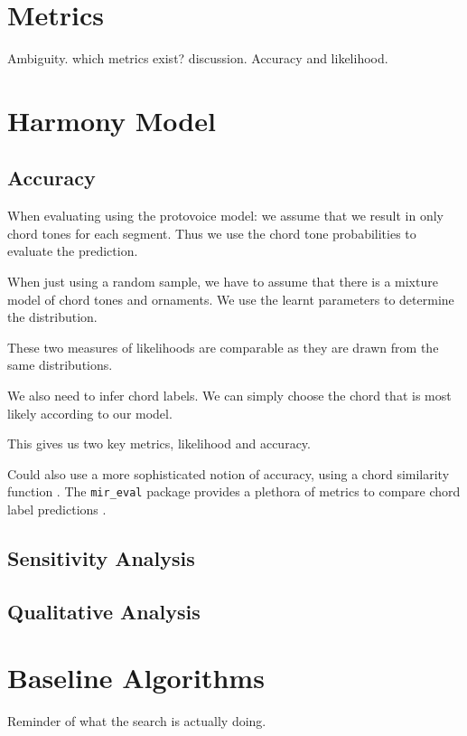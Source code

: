 \documentclass[12pt,a4paper,twoside,openright]{report}
\theoremstyle{definition}
\begin{document}
\section{Metrics}
Ambiguity. which metrics exist? discussion.
Accuracy and likelihood.

\section{Harmony Model}

\subsection{Accuracy}
When evaluating using the protovoice model: we assume that we result in only chord tones for each segment. Thus we use the chord tone probabilities to evaluate the prediction. 
\par
When just using a random sample, we have to assume that there is a mixture model of chord tones and ornaments. We use the learnt parameters to determine the distribution.
\par
These two measures of likelihoods are comparable as they are drawn from the same distributions.
\par
We also need to infer chord labels. We can simply choose the chord that is most likely according to our model.
\par 
This gives us two key metrics, likelihood and accuracy.
\par
Could also use a more sophisticated notion of accuracy, using a chord similarity function \cite{humphreyFourTimelyInsights2015}. The {\texttt {mir\_eval}} package provides a plethora of metrics to compare chord label predictions \cite{raffelMirEvalTransparent2014}. 

\subsection{Sensitivity Analysis}

\subsection{Qualitative Analysis}

\section{Baseline Algorithms}
Reminder of what the search is actually doing. 
\end{document}
